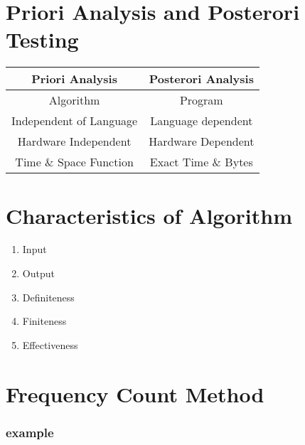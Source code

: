 \documentclass[12pt]{article}
\begin{document}
\section{Priori Analysis and Posterori Testing}


\begin{center}
  \bgroup
  \def\arraystretch{1.5}%
  \begin{tabular}{ C | C  }
    Priori Analysis
    &
    Posterori Analysis
     \\ \hline
     Algorithm
     &
     Program
     \\
     Independent of Language
     &
     Language dependent
     \\
     Hardware Independent
     &
     Hardware Dependent
     \\
     Time \& Space Function
     &
     Exact Time \& Bytes
     \\
  \end{tabular}
  \egroup
\end{center}


\section{Characteristics of Algorithm}


\begin{enumerate}
	\item Input
	\item Output
	\item Definiteness
	\item Finiteness
	\item Effectiveness
\end{enumerate}


\newpage

\section{Frequency Count Method}



\subsubsection{example}


\begin{center}
\end{center}
\end{document}
